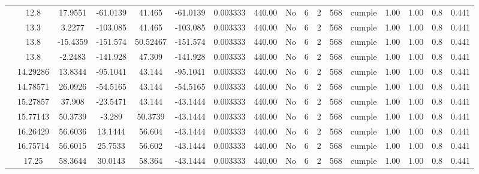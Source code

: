 \begin{table}[H]
{\begin{tabular}{|c|c|c|c|c|c|c|c|c|c|c|c|c|c|c|c|c|}
\cline{2-17}    & 12.8 & 17.9551 & -61.0139 & 41.465 & -61.0139 & 0.003333 & 440.00 & No  & 6   & 2   & 568 & \cellcolor[rgb]{ .776,  .937,  .808}cumple & 1.00 & 1.00 & 0.8 & 0.441 \bigstrut\\
\cline{2-17}    & 13.3 & 3.2277 & -103.085 & 41.465 & -103.085 & 0.003333 & 440.00 & No  & 6   & 2   & 568 & \cellcolor[rgb]{ .776,  .937,  .808}cumple & 1.00 & 1.00 & 0.8 & 0.441 \bigstrut\\
\cline{2-17}    & \cellcolor[rgb]{ .851,  .882,  .949}13.8 & -15.4359 & -151.574 & 50.52467 & -151.574 & 0.003333 & 440.00 & No  & 6   & 2   & 568 & \cellcolor[rgb]{ .776,  .937,  .808}cumple & 1.00 & 1.00 & 0.8 & 0.441 \bigstrut\\
\cline{2-17}    & \cellcolor[rgb]{ .851,  .882,  .949}13.8 & -2.2483 & -141.928 & 47.309 & -141.928 & 0.003333 & 440.00 & No  & 6   & 2   & 568 & \cellcolor[rgb]{ .776,  .937,  .808}cumple & 1.00 & 1.00 & 0.8 & 0.441 \bigstrut\\
\cline{2-17}    & 14.29286 & 13.8344 & -95.1041 & 43.144 & -95.1041 & 0.003333 & 440.00 & No  & 6   & 2   & 568 & \cellcolor[rgb]{ .776,  .937,  .808}cumple & 1.00 & 1.00 & 0.8 & 0.441 \bigstrut\\
\cline{2-17}    & 14.78571 & 26.0926 & -54.5165 & 43.144 & -54.5165 & 0.003333 & 440.00 & No  & 6   & 2   & 568 & \cellcolor[rgb]{ .776,  .937,  .808}cumple & 1.00 & 1.00 & 0.8 & 0.441 \bigstrut\\
\cline{2-17}    & 15.27857 & 37.908 & -23.5471 & 43.144 & -43.1444 & 0.003333 & 440.00 & No  & 6   & 2   & 568 & \cellcolor[rgb]{ .776,  .937,  .808}cumple & 1.00 & 1.00 & 0.8 & 0.441 \bigstrut\\
\cline{2-17}    & 15.77143 & 50.3739 & -3.289 & 50.3739 & -43.1444 & 0.003333 & 440.00 & No  & 6   & 2   & 568 & \cellcolor[rgb]{ .776,  .937,  .808}cumple & 1.00 & 1.00 & 0.8 & 0.441 \bigstrut\\
\cline{2-17}    & 16.26429 & 56.6036 & 13.1444 & 56.604 & -43.1444 & 0.003333 & 440.00 & No  & 6   & 2   & 568 & \cellcolor[rgb]{ .776,  .937,  .808}cumple & 1.00 & 1.00 & 0.8 & 0.441 \bigstrut\\
\cline{2-17}    & 16.75714 & 56.6015 & 25.7533 & 56.602 & -43.1444 & 0.003333 & 440.00 & No  & 6   & 2   & 568 & \cellcolor[rgb]{ .776,  .937,  .808}cumple & 1.00 & 1.00 & 0.8 & 0.441 \bigstrut\\
\cline{2-17}    & 17.25 & 58.3644 & 30.0143 & 58.364 & -43.1444 & 0.003333 & 440.00 & No  & 6   & 2   & 568 & \cellcolor[rgb]{ .776,  .937,  .808}cumple & 1.00 & 1.00 & 0.8 & 0.441 \bigstrut\\

\end{tabular}}
\end{table}
